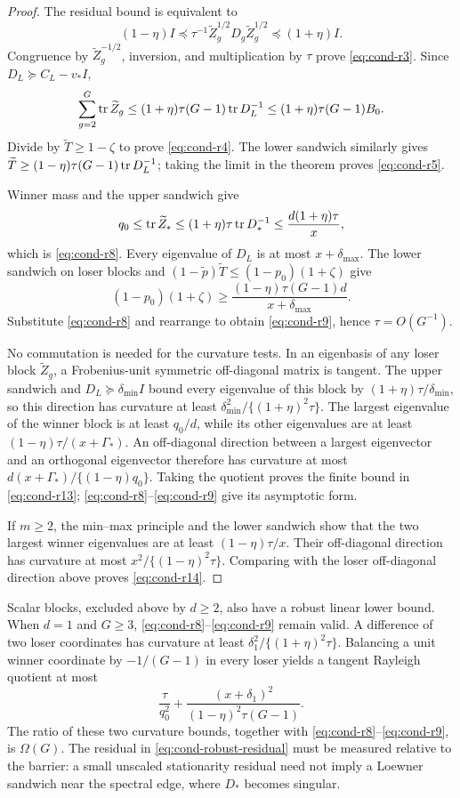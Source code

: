 \begin{proof}
The residual bound is equivalent to
\[
 (1-\eta)I\preceq\tau^{-1}\widetilde Z_g^{1/2}D_g
 \widetilde Z_g^{1/2}\preceq(1+\eta)I.
\]
Congruence by $\widetilde Z_g^{-1/2}$, inversion, and multiplication by
$\tau$ prove \eqref{eq:cond-r3}.  Since
$D_L\succeq C_L-v_*I$,
\[
 \sum_{g=2}^G\operatorname{tr}\widetilde Z_g
 \le(1+\eta)\tau(G-1)\operatorname{tr} D_L^{-1}
 \le(1+\eta)\tau(G-1)B_0.
\]
Divide by $\widetilde T\ge1-\zeta$ to prove
\eqref{eq:cond-r4}.  The lower sandwich similarly gives
$\widetilde T\ge(1-\eta)\tau(G-1)\operatorname{tr} D_L^{-1}$; taking the limit in the
theorem proves \eqref{eq:cond-r5}.

Winner mass and the upper sandwich give
\[
 q_0\le\operatorname{tr}\widetilde Z_*
 \le(1+\eta)\tau\operatorname{tr} D_*^{-1}
 \le\frac{d(1+\eta)\tau}{x},
\]
which is \eqref{eq:cond-r8}.  Every eigenvalue of $D_L$ is at most
$x+\delta_{\max}$.  The lower sandwich on loser blocks and
$(1-\widetilde p)\widetilde T\le(1-p_0)(1+\zeta)$ give
\[
 (1-p_0)(1+\zeta)\ge
 \frac{(1-\eta)\tau(G-1)d}{x+\delta_{\max}}.
\]
Substitute \eqref{eq:cond-r8} and rearrange to obtain
\eqref{eq:cond-r9}, hence $\tau=O(G^{-1})$.

No commutation is needed for the curvature tests.  In an eigenbasis of any
loser block $\widetilde Z_g$, a Frobenius-unit symmetric off-diagonal matrix
is tangent.  The upper sandwich and $D_L\succeq\delta_{\min}I$ bound every
eigenvalue of this block by $(1+\eta)\tau/\delta_{\min}$, so this direction
has curvature at least
$\delta_{\min}^2/\{(1+\eta)^2\tau\}$.  The largest eigenvalue of the winner
block is at least $q_0/d$, while its other eigenvalues are at least
$(1-\eta)\tau/(x+\Gamma_*)$.  An off-diagonal direction between a largest
eigenvector and an orthogonal eigenvector therefore has curvature at most
$d(x+\Gamma_*)/\{(1-\eta)q_0\}$.  Taking the quotient proves the finite
bound in \eqref{eq:cond-r13}; \eqref{eq:cond-r8}--\eqref{eq:cond-r9} give
its asymptotic form.

If $m\ge2$, the min--max principle and the lower sandwich show that the two
largest winner eigenvalues are at least $(1-\eta)\tau/x$.  Their
off-diagonal direction has curvature at most
$x^2/\{(1-\eta)^2\tau\}$.  Comparing with the loser off-diagonal direction
above proves \eqref{eq:cond-r14}.
\end{proof}

Scalar blocks, excluded above by $d\ge2$, also have a robust linear lower
bound.  When $d=1$ and $G\ge3$, \eqref{eq:cond-r8}--\eqref{eq:cond-r9}
remain valid.
A difference of two loser coordinates has curvature at least
$\delta_1^2/\{(1+\eta)^2\tau\}$.  Balancing a unit winner coordinate by
$-1/(G-1)$ in every loser yields a tangent Rayleigh quotient at most
\begin{equation}
 \frac{\tau}{q_0^2}+
 \frac{(x+\delta_1)^2}{(1-\eta)^2\tau(G-1)}.              \label{eq:cond-robust-scalar-soft}
\end{equation}
The ratio of these two curvature bounds, together with
\eqref{eq:cond-r8}--\eqref{eq:cond-r9}, is $\Omega(G)$.  The residual in
\eqref{eq:cond-robust-residual} must be measured relative to the barrier: a
small unscaled stationarity residual need not imply a Loewner sandwich near
the spectral edge, where $D_*$ becomes singular.

